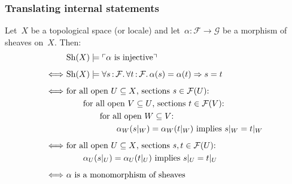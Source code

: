 \documentclass[12pt,utf8,notheorems,compress,t]{beamer}
\newcommand{\F}{\mathcal{F}}
\renewcommand{\G}{\mathcal{G}}
\newcommand{\Sh}{\mathrm{Sh}}
\renewcommand{\_}{\mathpunct{.}}
\newcommand{\?}{\,{:}\,}
\newcommand{\speak}[1]{\ulcorner\text{\textnormal{#1}}\urcorner}
\newcounter{framenumberpreappendix}
\newcommand{\backupend}{
  \addtocounter{framenumberpreappendix}{-\value{framenumber}}
  \addtocounter{framenumber}{\value{framenumberpreappendix}} 
}
\begin{document}
\begin{frame}\frametitle{Translating internal statements}
  Let~$X$ be a topological space (or locale) and let~$\alpha : \F \to \G$ be a
  morphism of sheaves on~$X$. Then:
  \allowdisplaybreaks
  \begin{align*}
    & \Sh(X) \models \speak{$\alpha$ is injective} \\[0.5em]
    \Longleftrightarrow\
    & \Sh(X) \models \forall s\?\F\_ \forall t\?\F\_ \alpha(s) = \alpha(t) \Rightarrow s = t \\[0.5em]
    \Longleftrightarrow\ &
      \text{for all open~$U \subseteq X$, sections $s \in \F(U)$:} \\
    &\qquad
      \text{for all open~$V \subseteq U$, sections $t \in \F(V)$:} \\
    &\qquad\qquad
        \text{for all open~$W \subseteq V$:} \\
    &\qquad\qquad\qquad
          \text{$\alpha_W(s|_W) = \alpha_W(t|_W)$ implies $s|_W = t|_W$} \\[0.5em]
    \Longleftrightarrow\ &
      \text{for all open~$U \subseteq X$, sections $s, t \in \F(U)$:} \\
    &\qquad
          \text{$\alpha_U(s|_U) = \alpha_U(t|_U)$ implies $s|_U = t|_U$} \\[0.5em]
    \Longleftrightarrow\ &
      \text{$\alpha$ is a monomorphism of sheaves}
  \end{align*}
\end{frame}

\backupend
\end{document}
